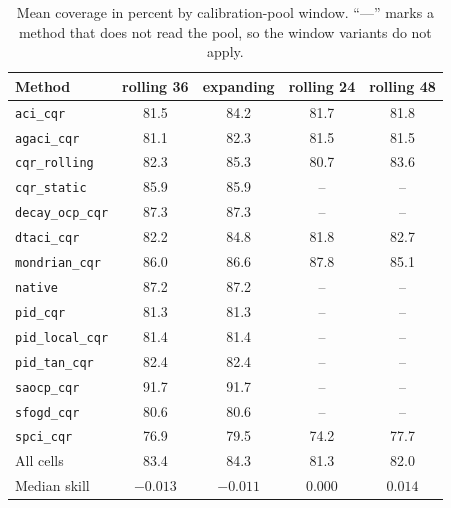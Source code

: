 \begin{table}[t]
\centering
\caption{Mean coverage in percent by calibration-pool window. ``---'' marks a method that does not read the pool, so the window variants do not apply.}
\label{tab:app_pool}
\begin{tabular}{lcccc}
\toprule
Method & rolling 36 & expanding & rolling 24 & rolling 48 \\
\midrule
\texttt{aci\_cqr}        & 81.5 & 84.2 & 81.7 & 81.8 \\
\texttt{agaci\_cqr}      & 81.1 & 82.3 & 81.5 & 81.5 \\
\texttt{cqr\_rolling}    & 82.3 & 85.3 & 80.7 & 83.6 \\
\texttt{cqr\_static}     & 85.9 & 85.9 & --   & --   \\
\texttt{decay\_ocp\_cqr} & 87.3 & 87.3 & --   & --   \\
\texttt{dtaci\_cqr}      & 82.2 & 84.8 & 81.8 & 82.7 \\
\texttt{mondrian\_cqr}   & 86.0 & 86.6 & 87.8 & 85.1 \\
\texttt{native}          & 87.2 & 87.2 & --   & --   \\
\texttt{pid\_cqr}        & 81.3 & 81.3 & --   & --   \\
\texttt{pid\_local\_cqr} & 81.4 & 81.4 & --   & --   \\
\texttt{pid\_tan\_cqr}   & 82.4 & 82.4 & --   & --   \\
\texttt{saocp\_cqr}      & 91.7 & 91.7 & --   & --   \\
\texttt{sfogd\_cqr}      & 80.6 & 80.6 & --   & --   \\
\texttt{spci\_cqr}       & 76.9 & 79.5 & 74.2 & 77.7 \\
\midrule
All cells                & 83.4 & 84.3 & 81.3 & 82.0 \\
Median skill             & $-0.013$ & $-0.011$ & $0.000$ & $0.014$ \\
\bottomrule
\end{tabular}
\end{table}

